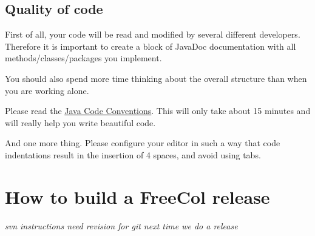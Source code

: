 \documentclass[12pt]{book}
\begin{document}
\hypertarget{Quality of code}{\section{Quality of code}}

First of all, your code will be read and modified by several
different developers.  Therefore it is important to create a
block of JavaDoc documentation with all methods/classes/packages
you implement.

You should also spend more time thinking about the overall
structure than when you are working alone.

Please read the \href{http://java.sun.com/docs/codeconv/}{Java Code
  Conventions}.  This will only take about 15 minutes and will really
help you write beautiful code.

And one more thing.  Please configure your editor in such a way
that code indentations result in the insertion of 4 spaces, and avoid
using tabs.


\hypertarget{How to build a FreeCol release}{\chapter{How to build a FreeCol release}}

\emph{svn instructions need revision for git next time we do a release}
\end{document}
